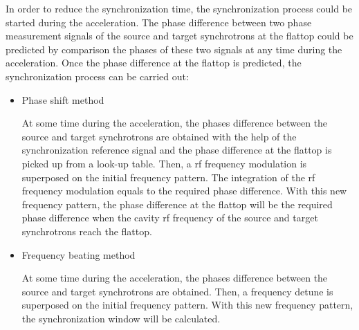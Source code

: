 In order to reduce the synchronization time, the synchronization process could be started during the acceleration. The phase difference between two phase measurement signals of the source and target synchrotrons at the flattop could be predicted by comparison the phases of these two signals at any time during the acceleration. Once the phase difference at the flattop is predicted, the synchronization process can be carried out: 
\begin{itemize}
	\item Phase shift method

At some time during the acceleration, the phases difference between the source and target synchrotrons are obtained with the help of the synchronization reference signal and the phase difference at the flattop is picked up from a look-up table. Then, a rf frequency modulation is superposed on the initial frequency pattern. The integration of the rf frequency modulation equals to the required phase difference. With this new frequency pattern, the phase difference at the flattop will be the required phase difference when the cavity rf frequency of the source and target synchrotrons reach the flattop. 
	\item Frequency beating method

At some time during the acceleration, the phases difference between the source and target synchrotrons are obtained. Then, a frequency detune is superposed on the initial frequency pattern. With this new frequency pattern, the synchronization window will be calculated. 
\end{itemize}